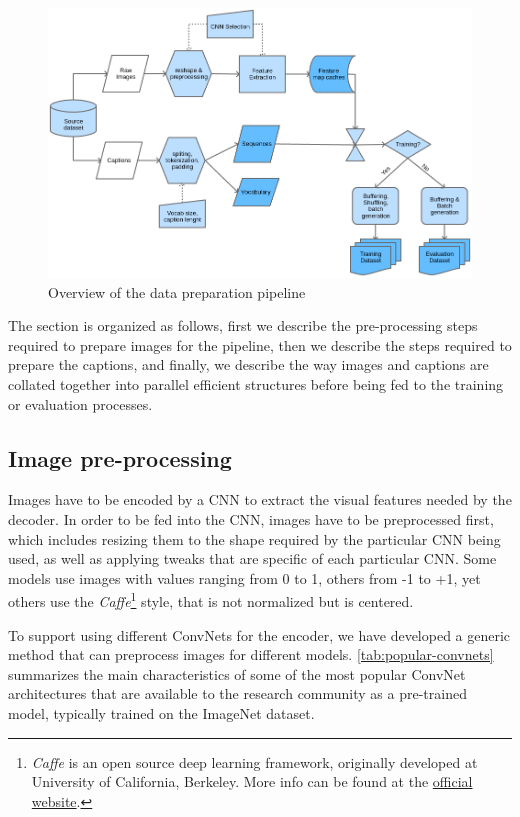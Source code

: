 \begin{figure}[hpt]
    \centering
    \includegraphics[scale=0.5]{images/ch4/data-pipelines.png}
    \caption{Overview of the data preparation pipeline}
    \label{fig:data-pipelines}
\end{figure}

The section is organized as follows, first we describe the pre-processing steps required to prepare images for the pipeline, then we describe the steps required to prepare the captions, and finally, we describe the way images and captions are collated together into parallel efficient structures before being fed to the training or evaluation processes.

\subsection{Image pre-processing}

Images have to be encoded by a CNN to extract the visual features needed by the decoder. In order to be fed into the CNN, images have to be preprocessed first, which includes resizing them to the shape required by the particular CNN being used, as well as applying tweaks that are specific of each particular CNN. Some models use images with values ranging from 0 to 1, others from -1 to +1, yet others use the \textit{Caffe}\footnote{\textit{Caffe} is an open source deep learning framework, originally developed at University of California, Berkeley. More info can be found at the \href{http://caffe.berkeleyvision.org/}{official website}.} style, that is not normalized but is centered. 

To support using different ConvNets for the encoder, we have developed a generic method that can preprocess images for different models. \cref{tab:popular-convnets} summarizes the main characteristics of some of the most popular ConvNet architectures that are available to the research community as a pre-trained model, typically trained on the ImageNet dataset.

